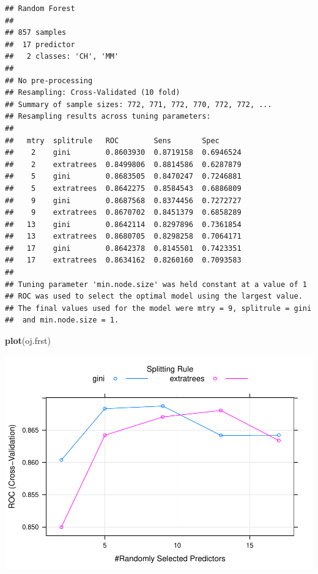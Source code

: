 \documentclass[]{book}
\newenvironment{Shaded}{\begin{snugshade}}{\end{snugshade}}
\newcommand{\DataTypeTok}[1]{\textcolor[rgb]{0.13,0.29,0.53}{#1}}
\newcommand{\KeywordTok}[1]{\textcolor[rgb]{0.13,0.29,0.53}{\textbf{#1}}}
\newcommand{\NormalTok}[1]{#1}
\newcommand{\OperatorTok}[1]{\textcolor[rgb]{0.81,0.36,0.00}{\textbf{#1}}}
\newcommand{\StringTok}[1]{\textcolor[rgb]{0.31,0.60,0.02}{#1}}
\begin{document}
\begin{verbatim}
## Random Forest 
## 
## 857 samples
##  17 predictor
##   2 classes: 'CH', 'MM' 
## 
## No pre-processing
## Resampling: Cross-Validated (10 fold) 
## Summary of sample sizes: 772, 771, 772, 770, 772, 772, ... 
## Resampling results across tuning parameters:
## 
##   mtry  splitrule   ROC        Sens       Spec     
##    2    gini        0.8603930  0.8719158  0.6946524
##    2    extratrees  0.8499806  0.8814586  0.6287879
##    5    gini        0.8683505  0.8470247  0.7246881
##    5    extratrees  0.8642275  0.8584543  0.6886809
##    9    gini        0.8687568  0.8374456  0.7272727
##    9    extratrees  0.8670702  0.8451379  0.6858289
##   13    gini        0.8642114  0.8297896  0.7361854
##   13    extratrees  0.8680705  0.8298258  0.7064171
##   17    gini        0.8642378  0.8145501  0.7423351
##   17    extratrees  0.8634162  0.8260160  0.7093583
## 
## Tuning parameter 'min.node.size' was held constant at a value of 1
## ROC was used to select the optimal model using the largest value.
## The final values used for the model were mtry = 9, splitrule = gini
##  and min.node.size = 1.
\end{verbatim}

\begin{Shaded}
\begin{Highlighting}[]
\KeywordTok{plot}\NormalTok{(oj.frst)}
\end{Highlighting}
\end{Shaded}

\includegraphics{data-sci_files/figure-latex/unnamed-chunk-81-1.pdf}

\begin{Shaded}
\end{Shaded}
\end{document}

